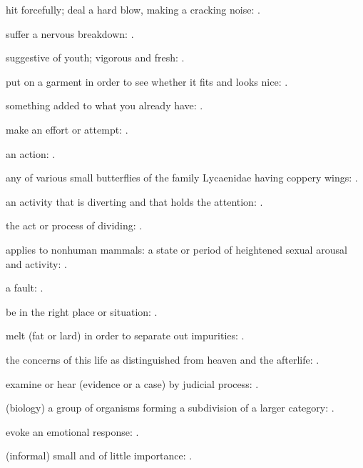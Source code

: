   hit forcefully; deal a hard blow, making a cracking noise: .

  suffer a nervous breakdown:   .

  suggestive of youth; vigorous and fresh:   .

  put on a garment in order to see whether it fits and looks nice:   .

  something added to what you already have:   .

  make an effort or attempt:   .

  an action: .

  any of various small butterflies of the family Lycaenidae having coppery wings: .

  an activity that is diverting and that holds the attention:   .

  the act or process of dividing: .

  applies to nonhuman mammals: a state or period of heightened sexual arousal and activity:   .

  a fault: .

  be in the right place or situation:   .

  melt (fat or lard) in order to separate out impurities:   .

  the concerns of this life as distinguished from heaven and the afterlife:   .

  examine or hear (evidence or a case) by judicial process:   .

  (biology) a group of organisms forming a subdivision of a larger category: .

  evoke an emotional response: .

  (informal) small and of little importance:   .

